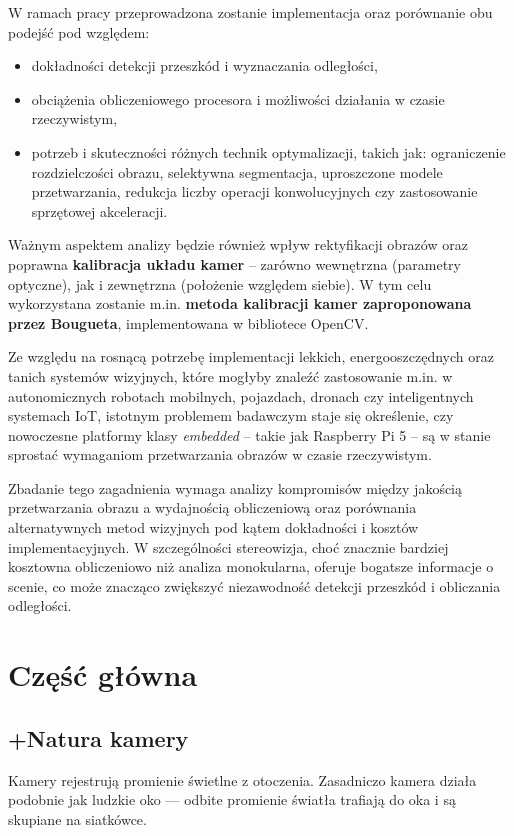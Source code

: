 \documentclass[magisterska]{pracadypl}
\begin{document}
W ramach pracy przeprowadzona zostanie implementacja oraz porównanie obu podejść pod względem:
\begin{itemize}
  \item dokładności detekcji przeszkód i wyznaczania odległości,
  \item obciążenia obliczeniowego procesora i możliwości działania w czasie rzeczywistym,
  \item potrzeb i skuteczności różnych technik optymalizacji, takich jak: ograniczenie rozdzielczości obrazu, selektywna segmentacja, uproszczone modele przetwarzania, redukcja liczby operacji konwolucyjnych czy zastosowanie sprzętowej akceleracji.
\end{itemize}

Ważnym aspektem analizy będzie również wpływ rektyfikacji obrazów oraz poprawna \textbf{kalibracja układu kamer} – zarówno wewnętrzna (parametry optyczne), jak i zewnętrzna (położenie względem siebie). W tym celu wykorzystana zostanie m.in. \textbf{metoda kalibracji kamer zaproponowana przez Bougueta}, implementowana w bibliotece OpenCV.

Ze względu na rosnącą potrzebę implementacji lekkich, energooszczędnych oraz tanich systemów wizyjnych, które mogłyby znaleźć zastosowanie m.in. w autonomicznych robotach mobilnych, pojazdach, dronach czy inteligentnych systemach IoT, istotnym problemem badawczym staje się określenie, czy nowoczesne platformy klasy \textit{embedded} – takie jak Raspberry Pi 5 – są w stanie sprostać wymaganiom przetwarzania obrazów w czasie rzeczywistym.

Zbadanie tego zagadnienia wymaga analizy kompromisów między jakością przetwarzania obrazu a wydajnością obliczeniową oraz porównania alternatywnych metod wizyjnych pod kątem dokładności i kosztów implementacyjnych. W szczególności stereowizja, choć znacznie bardziej kosztowna obliczeniowo niż analiza monokularna, oferuje bogatsze informacje o scenie, co może znacząco zwiększyć niezawodność detekcji przeszkód i obliczania odległości.

\chapter{Część główna}

\section{+Natura kamery}

Kamery rejestrują promienie świetlne z otoczenia. Zasadniczo kamera działa podobnie jak ludzkie oko — odbite promienie światła trafiają do oka i są skupiane na siatkówce.
\end{document}

